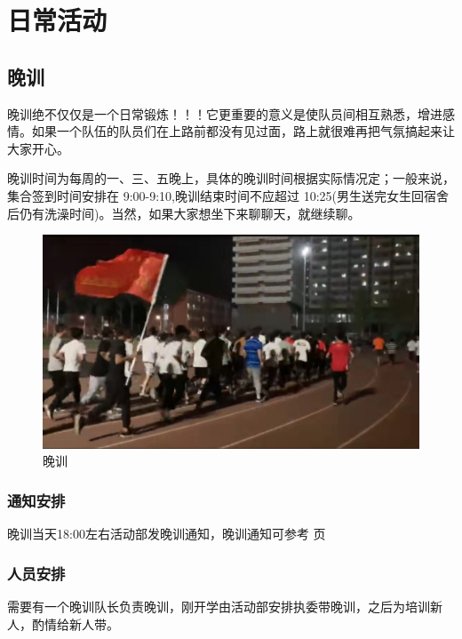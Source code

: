 \documentclass{ctexbook}
\begin{document}
\tableofcontents
\newpage 
\setcounter{page}{1}
\pagestyle{fancy}            
\fancyhf{}                  %
\lfoot{}
\cfoot{}
\rfoot{}
\setlength{\headheight}{12.7pt} 
\mainmatter
\chapter{日常活动}
\section{晚训}
\label{sec:晚训}

晚训绝不仅仅是一个日常锻炼！！！它更重要的意义是使队员间相互熟悉，增进感情。如果一个队伍的队员们在上路前都没有见过面，路上就很难再把气氛搞起来让大家开心。

晚训时间为每周的一、三、五晚上，具体的晚训时间根据实际情况定；一般来说，集合签到时间安排在 9:00-9:10,晚训结束时间不应超过 10:25(男生送完女生回宿舍后仍有洗澡时间)。当然，如果大家想坐下来聊聊天，就继续聊。
\begin{figure}[htp]
    \centering
    \includegraphics[width=1\linewidth]{fig/晚训}
    \caption{晚训}
\end{figure}

\clearpage
\subsection{通知安排}
晚训当天18:00左右活动部发晚训通知，晚训通知可参考 \pageref{ssec:晚训通知} 页

\subsection{人员安排}
需要有一个晚训队长负责晚训，刚开学由活动部安排执委带晚训，之后为培训新人，酌情给新人带。
\end{document}
